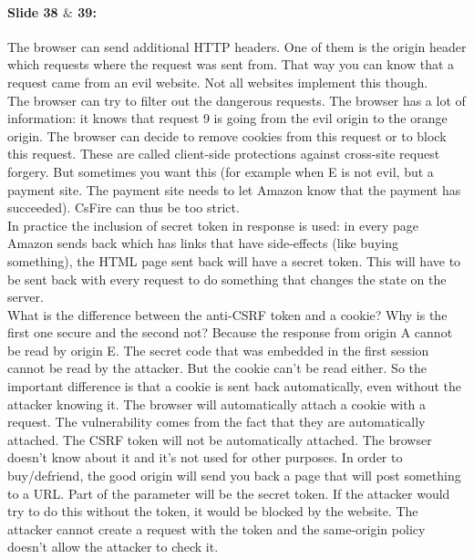 \documentclass[10pt,a4paper]{report}
\begin{document}
\paragraph{Slide 38 $\&$ 39:} The browser can send additional HTTP headers. One of them is the origin header which requests where the request was sent from. That way you can know that a request came from an evil website. Not all websites implement this though.\\
The browser can try to filter out the dangerous requests. The browser has a lot of information: it knows that request 9 is going from the evil origin to the orange origin. The browser can decide to remove cookies from this request or to block this request. These are called client-side protections against cross-site request forgery. But sometimes you want this (for example when E is not evil, but a payment site. The payment site needs to let Amazon know that the payment has succeeded). CsFire can thus be too strict. \\
In practice the inclusion of secret token in response is used: in every page Amazon sends back which has links that have side-effects (like buying something), the HTML page sent back will have a secret token. This will have to be sent back with every request to do something that changes the state on the server.\\
What is the difference between the anti-CSRF token and a cookie? Why is the first one secure and the second not? Because the response from origin A cannot be read by origin E. The secret code that was embedded in the first session cannot be read by the attacker. But the cookie can't be read either. So the important difference is that a cookie is sent back automatically, even without the attacker knowing it. The browser will automatically attach a cookie with a request. The vulnerability comes from the fact that they are automatically attached. The CSRF token will not be automatically attached. The browser doesn't know about it and it's not used for other purposes. In order to buy/defriend, the good origin will send you back a page that will post something to a URL. Part of the parameter will be the secret token. If the attacker would try to do this without the token, it would be blocked by the website. The attacker cannot create a request with the token and the same-origin policy doesn't allow the attacker to check it. 
\end{document}

